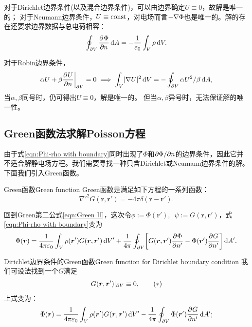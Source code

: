 \begin{remark}
    对于Dirichlet边界条件(以及混合边界条件)，可以由边界确定$U \equiv 0$，故解是唯一的；
    对于Neumann边界条件，$U \equiv \mathrm{const}$，对电场而言$-\nabla\Phi$也是唯一的。解的存在还要求边界数据与总电荷相容：
    \begin{equation}
        \label{eq:ed-neumann-compatibility}
        \oint_{\partial V}\frac{\partial^{}\Phi}{\partial{n}^{}}\mathop{}\!\mathrm{d} A = -\frac1{\varepsilon_0}\int_V\rho\mathop{}\!\mathrm{d} V.
    \end{equation}
\end{remark}

\begin{remark}
    对于Robin边界条件，
    \[
        {\alpha U + \beta\frac{\partial^{}U}{\partial{n}^{}}}\biggr\rvert_{\partial V} = 0 \implies \int_V\lvert\nabla U\rvert^2\mathop{}\!\mathrm{d} V = -\oint_{\partial V}\alpha U^2/\beta\mathop{}\!\mathrm{d} A,
    \]
    当$\alpha,\beta$同号时，仍可得出$U \equiv 0$，解是唯一的。
    但当$\alpha,\beta$异号时，无法保证解的唯一性。
\end{remark}

\subsection{Green函数法求解Poisson方程}
\label{ssec:Green solve Poisson}

由于式\eqref{eqn:Phi-rho with boundary}同时出现了$\Phi$和$\partial\Phi/\partial n$的边界条件，因此它并不适合解静电场方程。我们需要寻找一种只含Dirichlet或Neumann边界条件的解。下面我们引入Green函数。
\begin{definition}{Green函数}{Green function}
    Green函数是满足如下方程的一系列函数：
    \begin{equation}
        \nabla'^2G(\bm r,\bm r') = -4\pi\delta(\bm r - \bm r').
    \end{equation}
\end{definition}
回到Green第二公式\eqref{eqn:Green II}，这次令$\phi := \Phi(\bm r'),\enspace\psi := G(\bm r,\bm r')$，式\eqref{eqn:Phi-rho with boundary}变为
\begin{equation*}
    \Phi(\bm r) = \frac1{4\pi\varepsilon_0}\int_V\rho(\bm r')G(\bm r,\bm r')\mathop{}\!\mathrm{d} V' + \frac1{4\pi}\oint_{\partial V}\biggl[G(\bm r,\bm r')\frac{\partial^{}\Phi}{\partial{n'}^{}} - \Phi(\bm r')\frac{\partial^{}G}{\partial{n'}^{}}\biggr]\mathop{}\!\mathrm{d} A'.
\end{equation*}

\begin{theorem}
    {Dirichlet边界条件的Green函数}{Green function for Dirichlet boundary condition}
    我们可设法找到一个$G$满足
    \begin{equation}
        \label{eqn:Dirichlet Green condition}
        {G(\bm r,\bm r')}\rvert_{\partial V} \equiv 0,\tag{$\ast$}
    \end{equation}
    上式变为：
    \begin{equation}
        \label{eqn:Dirichlet Green}
        \Phi(\bm r) = \frac1{4\pi\varepsilon_0}\int_V\rho(\bm r')G(\bm r,\bm r')\mathop{}\!\mathrm{d} V' - \frac1{4\pi}\oint_{\partial V}\Phi(\bm r')\frac{\partial^{}G}{\partial{n'}^{}}\mathop{}\!\mathrm{d} A';
    \end{equation}
\end{theorem}

